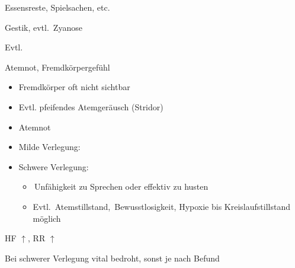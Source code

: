{
\begin{ABCDESlide}
  \item[\ABCDE{1}] Essensreste, Spielsachen, etc.
  \item[\ABCDE{2}] Gestik, evtl. {\RedFlag}\,Zyanose
  \item[\ABCDE{3}] Evtl. {\RedFlag}\,
  \item[\ABCDE{4}] Atemnot, Fremdkörpergefühl
  \item[\ABCDE{A}] %
  \begin{itemize}
    \item Fremdkörper oft nicht sichtbar
    \item Evtl. pfeifendes Atemgeräusch (Stridor)
  \end{itemize}
  \item[\ABCDE{B}] %
  \begin{itemize}
    \item Atemnot
    \item Milde Verlegung: 
    \item Schwere Verlegung:
    \begin{itemize}
      \item {\RedFlag}\,Unfähigkeit zu Sprechen oder
      effektiv zu husten
      \item Evtl. {\RedFlag}\,{Atemstillstand}, {\RedFlag}\,Bewusstlosigkeit,
      Hypoxie bis Kreislaufstillstand möglich
    \end{itemize}
  \end{itemize}
  \item[\ABCDE{C}] HF $\uparrow$, RR $\uparrow$
  \item[\ABCDE{=}] Bei schwerer Verlegung vital bedroht,
  sonst je nach Befund
\end{ABCDESlide}
}
{}
{}
{}




